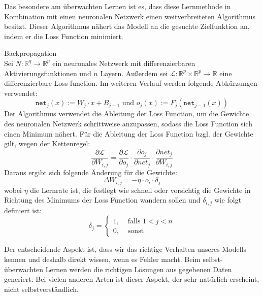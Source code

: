 \documentclass[12pt,letterpaper,ngerman]{article}
\begin{document}
\pagebreak
Das besondere am überwachten Lernen ist es, dass diese 
Lernmethode in Kombination mit einen neuronalen Netzwerk
einen weitverbreiteten Algorithmus besitzt. Dieser 
Algorithmus nähert das Modell an die gesuchte Zielfunktion an,
indem er die Loss Function minimiert.
\begin{definition}{Backpropagation}
  \\
  Sei $N: \mathbb{R}^q \to \mathbb{R}^p$ ein neuronales Netzwerk 
  mit differenzierbaren Aktivierungsfunktionen und $n$ Layern.
  Außerdem sei
  $\mathcal{L}: \mathbb{R}^p \times \mathbb{R}^p \to \mathbb{R}$
  eine
  differenzierbare Loss function.
  Im weiteren Verlauf werden folgende Abkürzungen verwendet:
  \[
    \texttt{net}_j(x) := W_j \cdot x + B_{j+1} \text{ und }
    o_j(x) := F_j(\texttt{net}_{j-1}(x))
  \]
  Der Algorithmus verwendet die Ableitung der Loss Function, um
  die Gewichte des neuronalen Netzwerk schrittweise anzupassen,
  sodass die Loss Function sich einen Minimum nähert. Für die 
  Ableitung der Loss Function bzgl. der Gewichte gilt, wegen
  der Kettenregel:
    \[
      \frac{\partial \mathcal{L}}{\partial W_{i,j}} = 
      \frac{\partial \mathcal{L}}{\partial o_j} \cdot
        \frac{\partial o_j}{\partial net_j} \cdot
        \frac{\partial net_j}{\partial W_{i,j}}
    \]
    Daraus ergibt sich folgende Änderung für die Gewichte:
    \[ \Delta W_{i,j} = -\eta \cdot o_i  \cdot \delta_j \]
    wobei $\eta$ die Lernrate ist, die festlegt wie schnell 
    oder vorsichtig die Gewichte in Richtung des Minimums
    der Loss Function wandern sollen und $\delta_{i,j}$ 
    wie folgt definiert ist:
    \[
      \delta_j =
        \begin{cases}
          1,& \text{ falls } 1 < j < n  \\
          0,& \text{ sonst}
        \end{cases}
    \]
\end{definition}
Der entscheidende Aspekt ist, dass wir das richtige Verhalten unseres Modells 
kennen und deshalb direkt wissen, wenn es Fehler macht. Beim selbst-überwachten
Lernen werden die richtigen Lösungen aus gegebenen Daten generiert. 
Bei vielen anderen Arten ist dieser Aspekt, der sehr natürlich erscheint,
nicht selbstverständlich.
\end{document}
